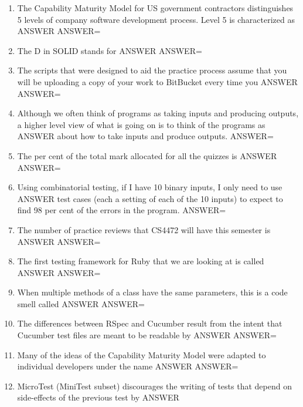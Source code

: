 \documentclass{exam}
\begin{document}
\begin{enumerate}
\item The Capability Maturity Model for US government contractors distinguishes 5 levels of company software development process.  Level 5 is characterized as ANSWER\newline
ANSWER=
\item The D in SOLID stands for ANSWER\newline
ANSWER=
\item The scripts that were designed to aid the practice process assume that you will be uploading a copy of your work to BitBucket every time you ANSWER\newline
ANSWER=
\item Although we often think of programs as taking inputs and producing outputs, a higher level view of what is going on is to think of the programs as ANSWER about how to take inputs and produce outputs.\newline
ANSWER=
\item The per cent of the total mark allocated for all the quizzes is ANSWER\newline
ANSWER=
\item Using combinatorial testing, if I have 10 binary inputs, I only need to use ANSWER test cases (each a setting of each of the 10 inputs) to expect to find 98 per cent of the errors in the program.\newline
ANSWER=
\item The number of practice reviews that CS4472 will have this semester is ANSWER\newline
ANSWER=
\item The first testing framework for Ruby that we are looking at is called ANSWER\newline
ANSWER=
\item When multiple methods of a class have the same parameters, this is a code smell called ANSWER\newline
ANSWER=
\item The differences between RSpec and Cucumber result from the intent that Cucumber test files are meant to be readable by ANSWER\newline
ANSWER=
\item Many of the ideas of the Capability Maturity Model were adapted to individual developers under the name ANSWER\newline
ANSWER=
\item MicroTest (MiniTest subset) discourages the writing of tests that depend on side-effects of the previous test by ANSWER\newline

\end{enumerate}
\end{document}
